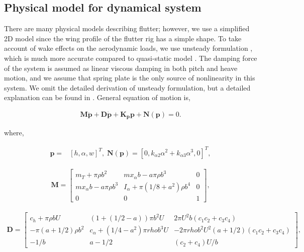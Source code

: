 \documentclass[openacc]{rsproca_new}%
\def\vec#1{\ensuremath{\mathbf{#1}}}
\begin{document}
\subsection{Physical model for dynamical system}\label{model}
There are many physical models describing flutter; however, we use a simplified 2D model since the wing profile of the flutter rig has a simple shape. To take account of wake effects on the aerodynamic loads, we use unsteady formulation \cite{abdelkefi2013analytical}, which is much more accurate compared to quasi-static model \cite{strganac2000identification}. The damping force of the system is assumed as linear viscous damping in both pitch and heave motion, and we assume that spring plate is the only source of nonlinearity in this system. We omit the detailed derivation of unsteady formulation, but a detailed explanation can be found in \cite{abdelkefi2013analytical}. General equation of motion is,

\begin{align}\label{eq:2-1}
\vec{M} \ddot{\vec{p}} + \vec{D} \dot{\vec{p}} +\vec{K_p} \vec{p} + \vec{N}(\vec{p}) =0.
\end{align}

\noindent where,

\begin{align}\label{eq:2-2}
\vec{p}=&[h,\alpha,w]^T, \; \vec{N}(\vec{p})=[0,k_{\alpha 2}\alpha^2+k_{\alpha 3}\alpha^3,0]^T,
\end{align}

\begin{align}\label{eq:2-3}
\vec{M}=
\begin{bmatrix}
    m_T+\pi \rho b^2       & m x_\alpha b-a\pi\rho b^3 & 0 \\
    m x_\alpha b-a\pi\rho b^3       & I_\alpha+\pi(1/8+a^2)\rho b^4 & 0 \\
    0       & 0 & 1
\end{bmatrix},
\end{align}

\begin{align}\label{eq:2-4}
\vec D=
\begin{bmatrix}
      c_h+\pi \rho b U        & (1+(1/2-a))\pi b^2 U & 2 \pi U^2 b (c_1c_2+c_3c_4) \\
      -\pi (a+1/2)\rho b^2        & c_\alpha+(1/4-a^2)\pi rho b^3 U & -2 \pi rho b^2 U^2 (a+1/2)(c_1c_2+c_3c_4) \\
      -1/b       & a-1/2 & (c_2+c_4)U/b
\end{bmatrix},
\end{align}
\end{document}
